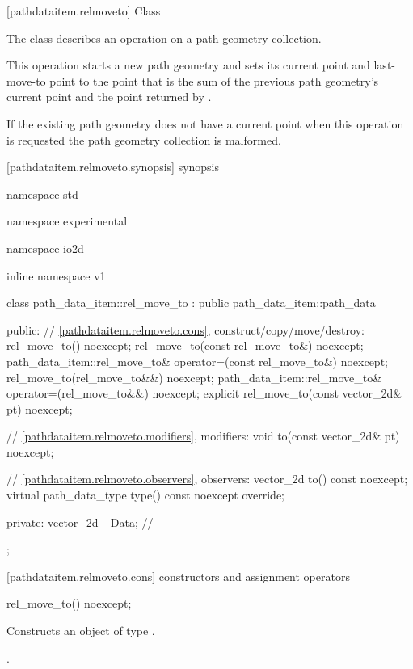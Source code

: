  [pathdataitem.relmoveto] {Class }

\pnum
{}
The class  describes an operation on a path geometry collection.

\pnum
This operation starts a new path geometry and sets its current point and last-move-to point to the point that is the sum of the previous path geometry's current point and the point returned by .

\pnum
If the existing path geometry does not have a current point when this operation is requested the path geometry collection is malformed.

 [pathdataitem.relmoveto.synopsis] { synopsis}

\begin{codeblock}
namespace std { namespace experimental { namespace io2d { inline namespace v1 {
  class path_data_item::rel_move_to : public path_data_item::path_data {
  public:
    // \ref{pathdataitem.relmoveto.cons}, construct/copy/move/destroy:
    rel_move_to() noexcept;
    rel_move_to(const rel_move_to&) noexcept;
    path_data_item::rel_move_to& operator=(const rel_move_to&) noexcept;
    rel_move_to(rel_move_to&&) noexcept;
    path_data_item::rel_move_to& operator=(rel_move_to&&) noexcept;
    explicit rel_move_to(const vector_2d& pt) noexcept;

    // \ref{pathdataitem.relmoveto.modifiers}, modifiers:
    void to(const vector_2d& pt) noexcept;

    // \ref{pathdataitem.relmoveto.observers}, observers:
    vector_2d to() const noexcept;
    virtual path_data_type type() const noexcept override;
    
  private:
    vector_2d _Data; // \expos
  };
} } } }
\end{codeblock}

 [pathdataitem.relmoveto.cons] { constructors and assignment operators}

\begin{itemdecl}
    rel_move_to() noexcept;
\end{itemdecl}
\begin{itemdescr}
	\pnum
	\effects
	Constructs an object of type .
	
	\pnum
	\postconditions
	.
\end{itemdescr}

